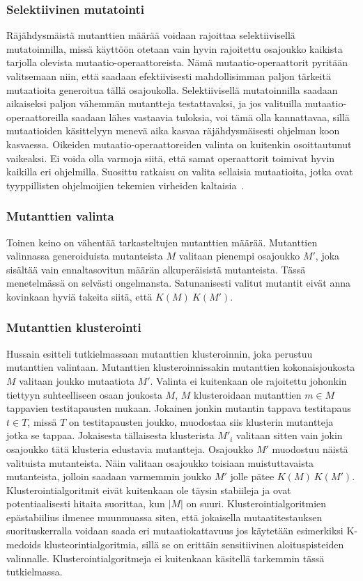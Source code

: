 \documentclass{tktltiki}
\begin{document}
\subsubsection{Selektiivinen mutatointi}
Räjähdysmäistä mutanttien määrää voidaan rajoittaa selektiivisellä mutatoinnilla, missä käyttöön otetaan vain hyvin rajoitettu osajoukko kaikista tarjolla olevista mutaatio-operaattoreista. Nämä mutaatio-operaattorit pyritään valitsemaan niin, että saadaan efektiivisesti mahdollisimman paljon tärkeitä mutaatioita generoitua tällä osajoukolla. Selektiivisellä mutatoinnilla saadaan aikaiseksi paljon vähemmän mutantteja testattavaksi, ja jos valituilla mutaatio-operaattoreilla saadaan lähes vastaavia tuloksia, voi tämä olla kannattavaa, sillä mutaatioiden käsittelyyn menevä aika kasvaa räjähdysmäisesti ohjelman koon kasvaessa. Oikeiden mutaatio-operaattoreiden valinta on kuitenkin osoittautunut vaikeaksi. Ei voida olla varmoja siitä, että samat operaattorit toimivat hyvin kaikilla eri ohjelmilla. Suosittu ratkaisu on valita sellaisia mutaatioita, jotka ovat tyyppillisten ohjelmoijien tekemien virheiden kaltaisia~\cite{}. 

\subsubsection{Mutanttien valinta}
Toinen keino on vähentää tarkasteltujen mutanttien määrää. Mutanttien valinnassa generoiduista mutanteista $M$ valitaan pienempi osajoukko $M'$, joka sisältää vain ennaltasovitun määrän alkuperäisistä mutanteista. Tässä menetelmässä on selvästi ongelmansta. Satunanisesti valitut mutantit eivät anna kovinkaan hyviä takeita siitä, että $K(M) ~ K(M')$.

\subsubsection{Mutanttien klusterointi}
Hussain esitteli tutkielmassaan mutanttien klusteroinnin, joka perustuu mutanttien valintaan. Mutanttien klusteroinnissakin mutanttien kokonaisjoukosta $M$ valitaan joukko mutaatiota $M'$. Valinta ei kuitenkaan ole rajoitettu johonkin tiettyyn suhteelliseen osaan joukosta $M$, $M$ klusteroidaan mutanttien $m\in M$ tappavien testitapausten mukaan. Jokainen jonkin mutantin tappava testitapaus $t\in T$, missä $T$ on testitapausten joukko, muodostaa siis klusterin mutantteja jotka se tappaa. Jokaisesta tällaisesta klusterista $M'_{i}$ valitaan sitten vain jokin osajoukko tätä klusteria edustavia mutantteja. Osajoukko $M'$ muodostuu näistä valituista mutanteista. Näin valitaan osajoukko toisiaan muistuttavaista mutanteista, jolloin saadaan varmemmin joukko $M'$ jolle pätee $K(M) ~ K(M')$. Klusterointialgoritmit eivät kuitenkaan ole täysin stabiileja ja ovat potentiaalisesti hitaita suorittaa, kun $|M|$ on suuri. Klusterointialgoritmien epästabiilius ilmenee muunmuassa siten, että jokaisella mutaatitestauksen suorituskerralla voidaan saada eri mutaatiokattavuus jos käytetään esimerkiksi K-medoids klusteorintialgoritmia, sillä se on erittäin sensitiivinen aloituspisteiden valinnalle. Klusterointialgoritmeja ei kuitenkaan käsitellä tarkemmin tässä tutkielmassa.
\end{document}
